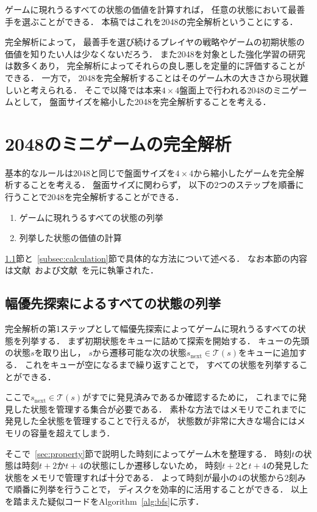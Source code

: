 ゲームに現れうるすべての状態の価値を計算すれば， 任意の状態において最善手を選ぶことができる．
本稿ではこれを2048の完全解析ということにする．

完全解析によって， 最善手を選び続けるプレイヤの戦略やゲームの初期状態の価値を知りたい人は少なくないだろう．
また2048を対象とした強化学習の研究は数多くあり， 完全解析によってそれらの良し悪しを定量的に評価することができる．
一方で， 2048を完全解析することはそのゲーム木の大きさから現状難しいと考えられる．
そこで以降では本来$4\times4$盤面上で行われる2048のミニゲームとして， 盤面サイズを縮小した2048を完全解析することを考える．

\section{2048のミニゲームの完全解析}
\label{sec:mini2048}
基本的なルールは2048と同じで盤面サイズを$4\times4$から縮小したゲームを完全解析することを考える．
盤面サイズに関わらず， 以下の$2$つのステップを順番に行うことで2048を完全解析することができる．

\begin{enumerate}
    \item ゲームに現れうるすべての状態の列挙
    \item 列挙した状態の価値の計算
\end{enumerate}

\ref{subsec:enumeration}節と~\ref{subsec:calculation}節で具体的な方法について述べる．
なお本節の内容は文献~\cite{3x3_2048}および文献~\cite{4x3_2048}を元に執筆された．

\subsection{幅優先探索によるすべての状態の列挙}
\label{subsec:enumeration}
完全解析の第1ステップとして幅優先探索によってゲームに現れうるすべての状態を列挙する．
まず初期状態をキューに詰めて探索を開始する．
キューの先頭の状態$s$を取り出し， $s$から遷移可能な次の状態$s_{\text{next}} \in \mathcal{T}(s)$をキューに追加する．
これをキューが空になるまで繰り返すことで， すべての状態を列挙することができる．

ここで$s_{\text{next}} \in \mathcal{T}(s)$がすでに発見済みであるか確認するために， これまでに発見した状態を管理する集合が必要である．
素朴な方法ではメモリでこれまでに発見した全状態を管理することで行えるが， 状態数が非常に大きな場合にはメモリの容量を超えてしまう．

そこで~\ref{sec:property}節で説明した時刻によってゲーム木を整理する．
時刻$t$の状態は時刻$t+2$か$t+4$の状態にしか遷移しないため， 時刻$t+2$と$t+4$の発見した状態をメモリで管理すれば十分である．
よって時刻が最小の$4$の状態から$2$刻みで順番に列挙を行うことで， ディスクを効率的に活用することができる．
以上を踏まえた疑似コードをAlgorithm~\ref{alg:bfs}に示す．

